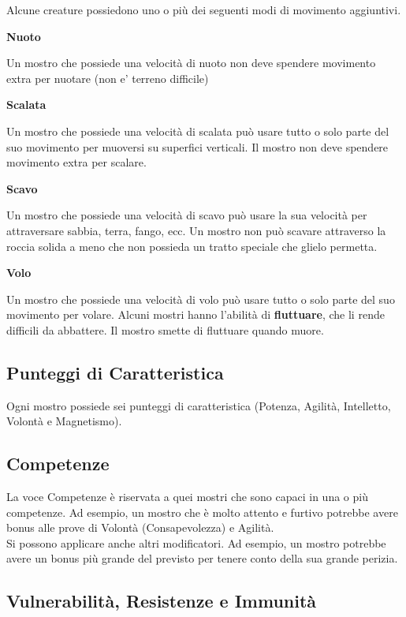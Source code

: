 \begin{multicols}{2}
Alcune creature possiedono uno o più dei seguenti modi di movimento aggiuntivi.

\medskip\textbf{Nuoto}

Un mostro che possiede una velocità di nuoto non deve spendere movimento extra per nuotare (non e' terreno difficile)

\medskip\textbf{Scalata}

Un mostro che possiede una velocità di scalata può usare tutto o solo parte del suo movimento per muoversi su superfici verticali. Il mostro non deve spendere movimento extra per scalare.

\medskip\textbf{Scavo}

Un mostro che possiede una velocità di scavo può usare la sua velocità per attraversare sabbia, terra, fango, ecc. Un mostro non può scavare attraverso la roccia solida a meno che non possieda un tratto speciale che glielo permetta.

\medskip\textbf{Volo}

Un mostro che possiede una velocità di volo può usare tutto o solo parte del suo movimento per volare. Alcuni mostri hanno l'abilità di \textbf{fluttuare}, che li rende difficili da abbattere. Il mostro smette di fluttuare quando muore.

\subsection{Punteggi di Caratteristica}

Ogni mostro possiede sei punteggi di caratteristica (Potenza, Agilità, Intelletto, Volontà e Magnetismo).

\subsection{Competenze}

La voce Competenze è riservata a quei mostri che sono capaci in una o più competenze. Ad esempio, un mostro che è molto attento e furtivo potrebbe avere bonus alle prove di Volontà (Consapevolezza) e Agilità. \\
Si possono applicare anche altri modificatori. Ad esempio, un mostro potrebbe avere un bonus più grande del previsto per tenere conto della sua grande perizia.

\subsection{Vulnerabilità, Resistenze e Immunità}


\end{multicols}
